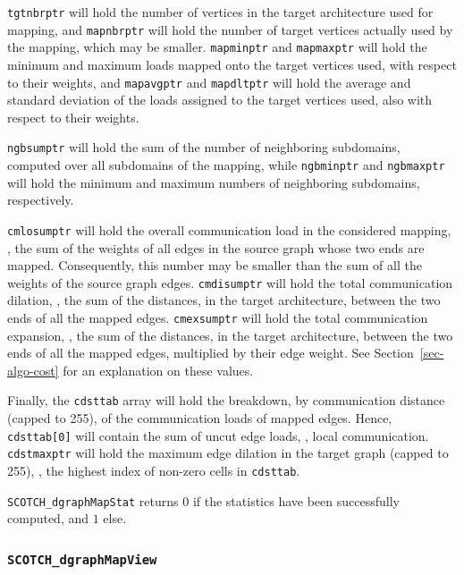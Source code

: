 \begin{itemize}
\texttt{tgtnbrptr} will hold the number of vertices in the target
architecture used for mapping, and \texttt{mapnbrptr} will hold the
number of target vertices actually used by the mapping, which may be
smaller. \texttt{mapminptr} and \texttt{mapmaxptr} will hold the
minimum and maximum loads mapped onto the target vertices used, with
respect to their weights, and \texttt{mapavgptr} and
\texttt{mapdltptr} will hold the average and standard deviation of the
loads assigned to the target vertices used, also with respect to their
weights.

\texttt{ngbsumptr} will hold the sum of the number of neighboring
subdomains, computed over all subdomains of the mapping, while
\texttt{ngbminptr} and \texttt{ngbmaxptr} will hold the minimum and
maximum numbers of neighboring subdomains, respectively.

\texttt{cmlosumptr} will hold the overall communication load in the
considered mapping, \ie, the sum of the weights of all edges in the
source graph whose two ends are mapped. Consequently, this number may
be smaller than the sum of all the weights of the source graph
edges. \texttt{cmdisumptr} will hold the total communication dilation,
\ie, the sum of the distances, in the target architecture, between the
two ends of all the mapped edges. \texttt{cmexsumptr} will hold the
total communication expansion, \ie, the sum of the distances, in the
target architecture, between the two ends of all the mapped edges,
multiplied by their edge weight. See Section~\ref{sec-algo-cost} for
an explanation on these values.

Finally, the \texttt{cdsttab} array will hold the breakdown, by
communication distance (capped to 255), of the communication loads of
mapped edges. Hence, \texttt{cdsttab[0]} will contain the sum of uncut
edge loads, \ie, local communication. \texttt{cdstmaxptr} will
hold the maximum edge dilation in the target graph (capped to 255),
\ie, the highest index of non-zero cells in \texttt{cdsttab}.

\progret

\texttt{SCOTCH\_dgraphMapStat} returns $0$ if the statistics
have been successfully computed, and $1$ else.
\end{itemize}

\subsubsection{{\tt SCOTCH\_dgraphMapView}}
\label{sec-lib-func-dgraphmapview}

